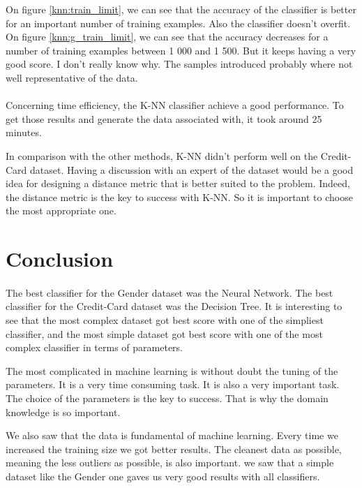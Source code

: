 \documentclass[10pt]{article}
\begin{document}
			On figure \ref{knn:train_limit}, we can see that the accuracy of the classifier is better for an important number of training examples. Also the classifier doesn't overfit. On figure \ref{knn:g_train_limit}, we can see that the accuracy decreases for a number of training examples between 1 000 and 1 500. But it keeps having a very good score. I don't really know why. The samples introduced probably where not well representative of the data.

		\paragraph*{}
			Concerning time efficiency, the K-NN classifier achieve a good performance. To get those results and generate the data associated with, it took around 25 minutes.

			In comparison with the other methods, K-NN didn't  perform well on the Credit-Card dataset. Having a discussion with an expert of the dataset would be a good idea for designing a distance metric that is better suited to the problem. Indeed, the distance metric is the key to success with K-NN. So it is important to choose the most appropriate one.
	\section{Conclusion}
		\paragraph*{}
			The best classifier for the Gender dataset was the Neural Network. The best classifier for the Credit-Card dataset was the Decision Tree. It is interesting to see that the most complex dataset got best score with one of the simpliest classifier, and the most simple dataset got best score with one of the most complex classifier in terms of parameters.

			The most complicated in machine learning is without doubt the tuning of the parameters. It is a very time consuming task. It is also a very important task. The choice of the parameters is the key to success. That is why the domain knowledge is so important.

			We also saw that the data is fundamental of machine learning. Every time we increased the training size we got better results. The cleanest data as possible, meaning the less outliers as possible, is also important. we saw that a simple dataset like the Gender one gaves us very good results with all classifiers.
\end{document}
